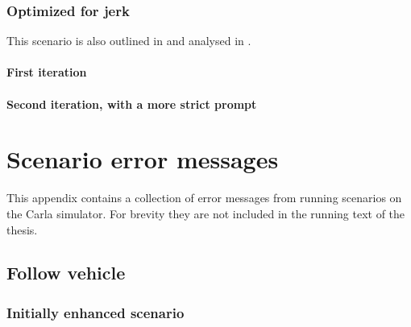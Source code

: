 


\subsection{Optimized for jerk}\label{sec:appendixJerkOptimizedAccident}

This scenario is also outlined in  and analysed in .

\subsubsection{First iteration}




\subsubsection{Second iteration, with a more strict prompt}



\chapter{Scenario error messages}\label{sec:errorMessages}

This appendix contains a collection of error messages from running scenarios on the Carla simulator.
For brevity they are not included in the running text of the thesis.

\section{Follow vehicle}

\subsection{Initially enhanced scenario }

